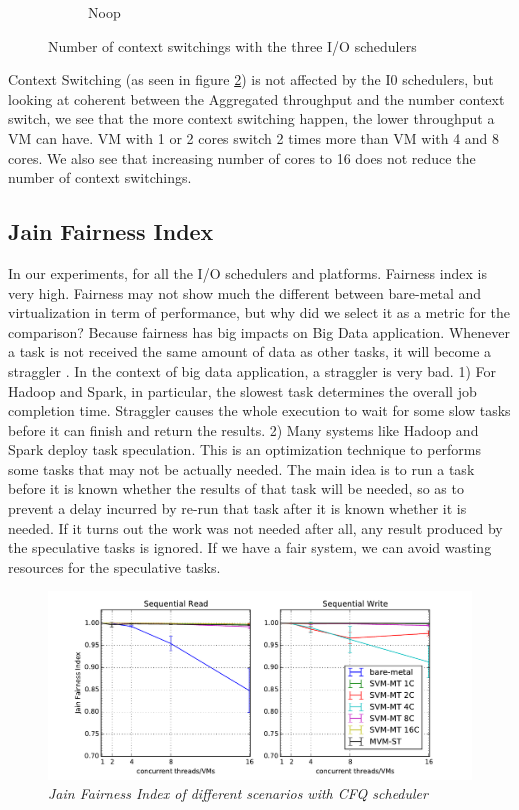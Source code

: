 \documentclass{acmsig}
\begin{document}
\begin{figure}[t]
\begin{subfigure}[b]{0.3\textwidth}
     \caption{Noop}
     \label{fig:contextswitching_noop_write}
   \end{subfigure}
   \caption{Number of context switchings with the three I/O schedulers}\label{fig:contextswitching}
\end{figure}

Context Switching (as seen in figure \ref{fig:contextswitching}) is not affected by the I0 schedulers, but looking at coherent between the Aggregated throughput and the number context switch, we see that the more context switching happen, the lower throughput a VM can have. VM with 1 or 2 cores switch 2 times more than VM with 4 and 8 cores. We also see that increasing number of cores to 16 does not reduce the number of context switchings.

\subsection{Jain Fairness Index}
In our experiments, for all the I/O schedulers and platforms. Fairness index is very high. Fairness may not show much the different between bare-metal and virtualization in term of performance, but why did we select it as a metric for the comparison? Because fairness has big impacts on Big Data application. Whenever a task is not received the same amount of data as other tasks, it will become a straggler \cite{matei08}. In the context of big data application, a straggler is very bad. 1) For Hadoop and Spark, in particular, the slowest task determines the overall job completion time. Straggler causes the whole execution to wait for some slow tasks before it can finish and return the results. 2) Many systems like Hadoop and Spark deploy task speculation. This is an optimization technique to performs some tasks that may not be actually needed. The main idea is to run a task before it is known whether the results of that task will be needed, so as to prevent a delay incurred by re-run that task after it is known whether it is needed. If it turns out the work was not needed after all, any result produced by the speculative tasks is ignored. If we have a fair system, we can avoid wasting resources for the speculative tasks.
 
\begin{figure}[t]
  \includegraphics[scale=0.85]{figures/JFI.pdf}
  \caption{\textit{Jain Fairness Index of different scenarios with CFQ scheduler}}
  \label{fig:jfi}
\end{figure}
\end{document}
